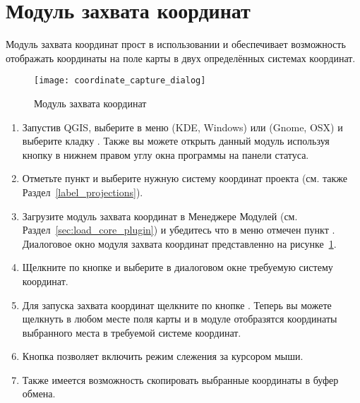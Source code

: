 
\section{Модуль захвата координат}


Модуль захвата координат прост в использовании и обеспечивает возможность
отображать координаты на поле карты в двух определённых системах координат.

\begin{figure}[ht]
   \centering
   \texttt{[image: coordinate\_capture\_dialog]}
   \caption{Модуль захвата координат \nixcaption}\label{fig:coordinate_capture_dialog}
\end{figure}

\begin{enumerate}
  \item Запустив QGIS, выберите  в меню
   (KDE, Windows) или  (Gnome, OSX)
  и выберите кладку . Также вы можете открыть данный модуль
  используя кнопку 
  в нижнем правом углу окна программы на панели статуса.
  \item Отметьте пункт 
  и выберите нужную систему координат проекта (см. также Раздел~\ref{label_projections}).
  \item Загрузите модуль захвата координат в Менеджере Модулей (см. Раздел~\ref{sec:load_core_plugin})
  и убедитесь что в меню  \arrow {}
  отмечен пункт .
  Диалоговое окно модуля захвата координат представленно на
  рисунке~\ref{fig:coordinate_capture_dialog}.
  \item Щелкните по кнопке  и выберите в диалоговом окне
  требуемую систему координат.
  \item Для запуска захвата координат щелкните по кнопке .
  Теперь вы можете щелкнуть в любом месте поля карты и в модуле отобразятся
  координаты выбранного места в требуемой системе координат.
  \item Кнопка  позволяет включить
  режим слежения за курсором мыши.
  \item Также имеется возможность скопировать выбранные координаты в буфер обмена.
\end{enumerate}

\FloatBarrier
